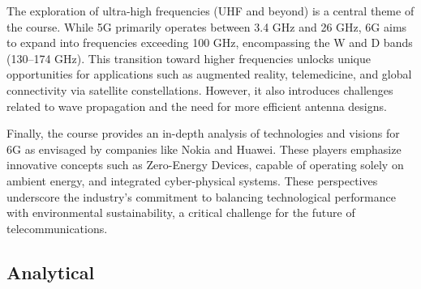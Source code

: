 The exploration of ultra-high frequencies (UHF and beyond) is a central theme of the course. While 5G primarily operates between 3.4 GHz and 26 GHz, 6G aims to expand into frequencies exceeding 100 GHz, encompassing the W and D bands (130–174 GHz). This transition toward higher frequencies unlocks unique opportunities for applications such as augmented reality, telemedicine, and global connectivity via satellite constellations. However, it also introduces challenges related to wave propagation and the need for more efficient antenna designs.

Finally, the course provides an in-depth analysis of technologies and visions for 6G as envisaged by companies like Nokia and Huawei. These players emphasize innovative concepts such as Zero-Energy Devices, capable of operating solely on ambient energy, and integrated cyber-physical systems. These perspectives underscore the industry's commitment to balancing technological performance with environmental sustainability, a critical challenge for the future of telecommunications.

\subsection{Analytical}



